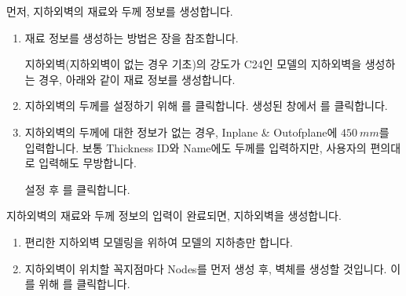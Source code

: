 \documentclass[a4paper,11pt,korean,openany,oneside]{sphinxmanual}
\begin{document}
\begin{sphinxShadowBox}

\sphinxAtStartPar
먼저, 지하외벽의 재료와 두께 정보를 생성합니다.
\begin{enumerate}
%
\item {} 
\sphinxAtStartPar
재료 정보를 생성하는 방법은 {\hyperref[\detokenize{1_material_setting::doc}]{}} 장을 참조합니다.

\sphinxAtStartPar
지하외벽(지하외벽이 없는 경우 기초)의 강도가 C24인 모델의 지하외벽을 생성하는 경우, 아래와 같이 재료 정보를 생성합니다.

\newpage

\begin{center}
\noindent{}
\end{center}

\item {} 
\sphinxAtStartPar
지하외벽의 두께를 설정하기 위해  \sphinxhyphen{} 를 클릭합니다. 생성된 창에서 를 클릭합니다.

\item {} 
\sphinxAtStartPar
지하외벽의 두께에 대한 정보가 없는 경우, In\sphinxhyphen{}plane \& Out\sphinxhyphen{}of\sphinxhyphen{}plane에 \(450 \ mm\)를 입력합니다.
보통 Thickness ID와 Name에도 두께를 입력하지만, 사용자의 편의대로 입력해도 무방합니다.

\sphinxAtStartPar
설정 후  \sphinxhyphen{} 를 클릭합니다.

\newpage

\begin{center}
\noindent{}
\end{center}

\end{enumerate}

\sphinxAtStartPar
지하외벽의 재료와 두께 정보의 입력이 완료되면, 지하외벽을 생성합니다.
\begin{enumerate}
%
\setcounter{enumi}{3}
\item {} 
\sphinxAtStartPar
편리한 지하외벽 모델링을 위하여 모델의 지하층만 합니다.

\item {} 
\sphinxAtStartPar
지하외벽이 위치할 꼭지점마다 Nodes를 먼저 생성 후, 벽체를 생성할 것입니다.
이를 위해  \sphinxhyphen{} 를 클릭합니다.


\end{enumerate}
\end{sphinxShadowBox}
\end{document}
